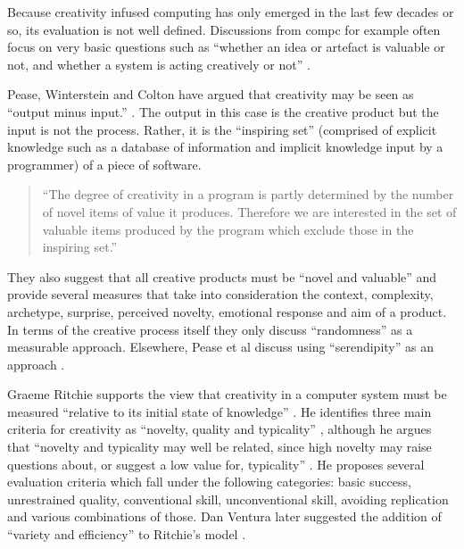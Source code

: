 Because creativity infused computing has only emerged in the last few decades or so, its evaluation is not well defined. Discussions from \gls{compc} for example often focus on very basic questions such as ``whether an idea or artefact is valuable or not, and whether a system is acting creatively or not'' \autocite{Pease2011}.

Pease, Winterstein and Colton have argued that creativity may be seen as ``output minus input.'' \autocite[p.2]{Pease2001}. The output in this case is the creative product but the input is not the process. Rather, it is the ``inspiring set'' (comprised of explicit knowledge such as a database of information and implicit knowledge input by a programmer) of a piece of software.

\begin{quotation}
  ``The degree of creativity in a program is partly determined by the number of novel items of value it produces. Therefore we are interested in the set of valuable items produced by the program which exclude those in the inspiring set.'' 
\end{quotation}

They also suggest that all creative products must be ``novel and valuable'' \citeyear[p.1]{Pease2001} and provide several measures that take into consideration the context, complexity, archetype, surprise, perceived novelty, emotional response and aim of a product. In terms of the creative process itself they only discuss ``randomness'' as a measurable approach. Elsewhere, Pease et al discuss using ``serendipity'' as an approach \citeyear{Pease2013}.

Graeme Ritchie supports the view that creativity in a computer system must be measured ``relative to its initial state of knowledge'' \autocite[p.72]{Ritchie2007}. He identifies three main criteria for creativity as ``novelty, quality and typicality'' \citeyear[p.72-73]{Ritchie2007}, although he argues that ``novelty and typicality may well be related, since high novelty may raise questions about, or suggest a low value for, typicality'' \citeyear[p.73]{Ritchie2007} \citeyear[see also][]{Ritchie2001}. He proposes several evaluation criteria which fall under the following categories: \autocite[p.91-92]{Ritchie2007} basic success, unrestrained quality, conventional skill, unconventional skill, avoiding replication and various combinations of those. Dan Ventura later suggested the addition of ``variety and efficiency'' to Ritchie's model \citeyear[p.7]{Ventura2008}.

